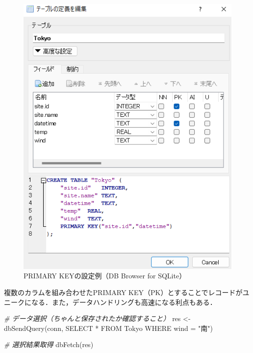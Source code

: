 \documentclass[
]{article}
\newenvironment{Shaded}{\begin{snugshade}}{\end{snugshade}}
\newcommand{\CommentTok}[1]{\textcolor[rgb]{0.56,0.35,0.01}{\textit{#1}}}
\newcommand{\FunctionTok}[1]{\textcolor[rgb]{0.00,0.00,0.00}{#1}}
\newcommand{\NormalTok}[1]{#1}
\newcommand{\OtherTok}[1]{\textcolor[rgb]{0.56,0.35,0.01}{#1}}
\newcommand{\StringTok}[1]{\textcolor[rgb]{0.31,0.60,0.02}{#1}}
\begin{document}
\begin{figure}
\centering
\includegraphics{../fig/db_browser_table_def.png}
\caption{PRIMARY KEYの設定例（DB Browser for SQLite）}
\end{figure}

複数のカラムを組み合わせたPRIMARY
KEY（PK）とすることでレコードがユニークになる．また，データハンドリングも高速になる利点もある．

\begin{Shaded}
\begin{Highlighting}[]
\CommentTok{\# データ選択（ちゃんと保存されたか確認すること）}
\NormalTok{res }\OtherTok{\textless{}{-}} \FunctionTok{dbSendQuery}\NormalTok{(conn, }\StringTok{\textquotesingle{}SELECT * FROM Tokyo WHERE wind = "南"\textquotesingle{}}\NormalTok{)}

\CommentTok{\# 選択結果取得}
\FunctionTok{dbFetch}\NormalTok{(res)}
\end{Highlighting}
\end{Shaded}
\end{document}
